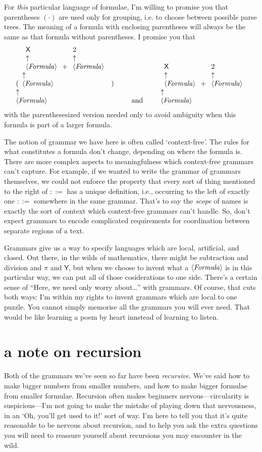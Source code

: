 \documentclass{book}
\begin{document}
For \emph{this} particular language of formulae, I'm willing to promise you that parentheses $(\cdot)$ are used only for grouping, i.e. to choose between possible parse trees. The meaning of a formula with enclosing parentheses will always be the same as that formula without parentheses. I promise you that
\[\nta{Formula}{(\nta{Formula}{\nta{Formula}{\X}+\nta{Formula}{2}})}
\qquad\mbox{and}\qquad
\nta{Formula}{\nta{Formula}{\X}+\nta{Formula}{2}}
\]
with the parenthesesized version needed only to avoid ambiguity when this formula is part of a larger formula.

The notion of grammar we have here is often called `context-free'. The rules for what constitutes a formula don't change, depending on where the formula is. There are more complex aspects to meaningfulness which context-free grammars can't capture. For example, if we wanted to write the grammar of grammars themselves, we could not enforce the property that every sort of thing mentioned to the right of $::=$ has a unique definition, i.e., occurring to the left of exactly one $::=$ somewhere in the same grammar. That's to say the \emph{scope} of names is exactly the sort of context which context-free grammars can't handle. So, don't expect grammars to encode complicated requirements for coordination between separate regions of a text.

Grammars give us a way to specify languages which are local, artificial, and closed. Out there, in the wilds of mathematics, there might be subtraction and division and $\pi$ and $\mathsf{Y}$, but when we choose to invent what a $\nt{Formula}$ is in this particular way, we can put all of those cosiderations to one side. There's a certain sense of ``Here, we need only worry about\ldots'' with grammars. Of course, that cuts both ways: I'm within my rights to invent grammars which are local to one puzzle. You cannot simply memorise all the grammars you will ever need. That would be like learning a poem by heart innstead of learning to listen.


\section{a note on recursion}

Both of the grammars we've seen so far have been \emph{recursive}. We've said how to make bigger numbers from smaller numbers, and how to make bigger formulae from smaller formulae. Recursion often makes beginners nervous---circularity is suspicious---I'm not going to make the mistake of playing down that nervousness, in an `Oh, you'll get used to it!' sort of way. I'm here to tell you that it's quite reasonable to be nervous about recursion, and to help you ask the extra questions you will need to reassure yourself about recursions you may encounter in the wild.
\end{document}
